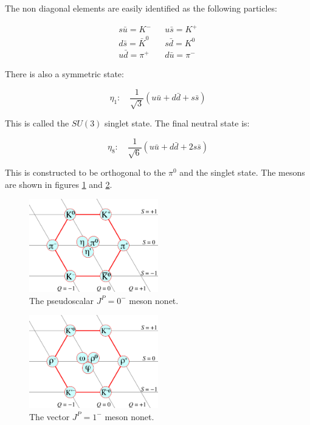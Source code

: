 The non diagonal elements are easily identified as the following particles:

\begin{eqnarray*}
  s\bar{u} = K^- & & u\bar{s} = K^+ \\
  d\bar{s} = \bar{K}^0 & & s\bar{d} = K^0 \\
  u\bar{d} = \pi^+ & & d\bar{u} = \pi^-
\end{eqnarray*}

There is also a symmetric state:

\[
  \eta_1: \quad \frac{1}{\sqrt{3}}\left( u\bar{u} + d\bar{d} + s\bar{s} \right)
\]

This is called the $SU(3)$ singlet state.  The final neutral state is:

\[
  \eta_8: \quad \frac{1}{\sqrt{6}}\left(u\bar{u} + d\bar{d} + 2s\bar{s} \right)
\]

This is constructed to be orthogonal to the $\pi^0$ and the singlet state.  The mesons are shown in figures \ref{fig:ch3_mesonNonetSpin0} and \ref{fig:ch3_mesonNonetSpin1}.

\begin{figure}[!htb]
  \begin{center}
    \includegraphics[width=0.5\textwidth]{images/chapter_3/MesonNonetSpin0.pdf}
    \caption[$J^{P}=0^-$ meson nonet]{The pseudoscalar $J^{P}=0^-$ meson nonet. \cite{mesonNonets}}
    \label{fig:ch3_mesonNonetSpin0}
  \end{center}
\end{figure}

\begin{figure}[!htb]
  \begin{center}
    \includegraphics[width=0.5\textwidth]{images/chapter_3/MesonNonetSpin1.pdf}
    \caption[$J^{P}=1^-$ meson nonet]{The vector $J^{P}=1^-$ meson nonet. \cite{mesonNonets}}
    \label{fig:ch3_mesonNonetSpin1}
  \end{center}
\end{figure}

